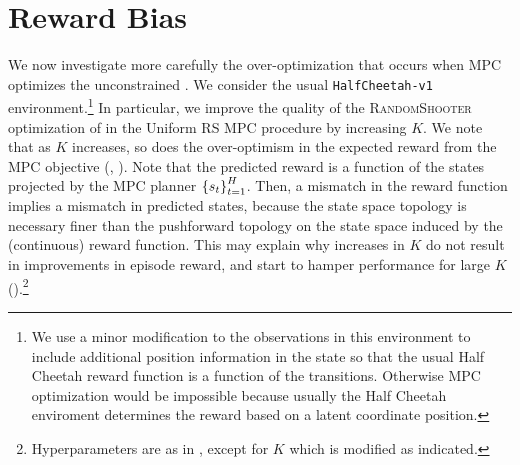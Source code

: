 \documentclass{article}
\begin{document}

\section{Reward Bias}
We now investigate more carefully the over-optimization that occurs when MPC optimizes the unconstrained . We consider the usual \texttt{HalfCheetah-v1} environment.\footnote{We use a minor modification to the observations in this environment to include additional position information in the state so that the usual Half Cheetah reward function is a function of the transitions. Otherwise MPC optimization would be impossible because usually the Half Cheetah enviroment determines the reward based on a latent coordinate position.} In particular, we improve the quality of the \textsc{RandomShooter} optimization of  in the Uniform RS MPC procedure by increasing $K$. We note that as $K$ increases, so does the over-optimism in the expected reward from the MPC objective (, ). Note that the predicted reward is a function of the states projected by the MPC planner $\left\{{s_t}\right\}_{t=1}^H$. Then, a mismatch in the reward function implies a mismatch in predicted states, because the state space topology is necessary finer than the pushforward topology on the state space induced by the (continuous) reward function. This may explain why increases in $K$ do not result in improvements in episode reward, and start to hamper performance for large $K$ ().\footnote{Hyperparameters are as in , except for $K$ which is modified as indicated.}
\end{document}

